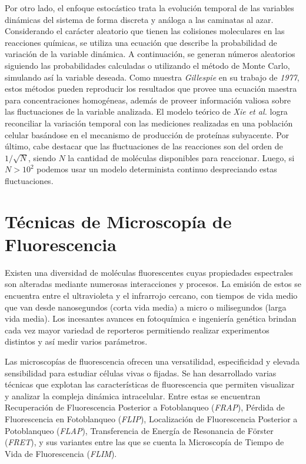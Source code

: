 Por otro lado, el enfoque estocástico trata la evolución temporal de las variables dinámicas del sistema de forma discreta y análoga a las caminatas al azar. Considerando el carácter aleatorio que tienen las colisiones moleculares en las reacciones químicas, se utiliza una ecuación que describe la probabilidad de variación de la variable dinámica. A continuación, se generan números aleatorios siguiendo las probabilidades calculadas o utilizando el método de Monte Carlo, simulando así la variable deseada\cite{Gillespie1977}. Como muestra \textit{Gillespie} en su trabajo de \textit{1977}\cite{Gillespie1977}, estos métodos pueden reproducir los resultados que provee una ecuación maestra para concentraciones homogéneas, además de proveer información valiosa sobre las fluctuaciones de la variable analizada. El modelo teórico de \textit{Xie et al.} logra reconciliar la variación temporal con las mediciones realizadas en una población celular basándose en el mecanismo de producción de proteínas subyacente\cite{Friedman2006}. Por último, cabe destacar que las fluctuaciones de las reacciones son del orden de $1/\sqrt{N}$, siendo $N$ la cantidad de moléculas disponibles para reaccionar. Luego, si $N>10^2$ podemos usar un modelo determinista continuo despreciando estas fluctuaciones\cite{Chen2010}.

\section{Técnicas de Microscopía de Fluorescencia}

Existen una diversidad de moléculas fluorescentes cuyas propiedades espectrales son alteradas mediante numerosas interacciones y procesos. La emisión de estos se encuentra entre el ultravioleta y el infrarrojo cercano, con tiempos de vida medio que van desde nanosegundos (corta vida media) a micro o milisegundos (larga vida media). Los incesantes avances en fotoquímica e ingeniería genética brindan cada vez mayor variedad de reporteros permitiendo realizar experimentos distintos y así medir varios parámetros\cite{Lakowicz2006}.

Las microscopías de fluorescencia ofrecen una versatilidad, especificidad y elevada sensibilidad para estudiar células vivas o fijadas. Se han desarrollado varias técnicas que explotan las características de fluorescencia que permiten visualizar y analizar la compleja dinámica intracelular. Entre estas se encuentran Recuperación de Fluorescencia Posterior a Fotoblanqueo (\textit{FRAP}), Pérdida de Fluorescencia en Fotoblanqueo (\textit{FLIP}), Localización de Fluorescencia Posterior a Potoblanqueo (\textit{FLAP}), Transferencia de Energía de Resonancia de Förster (\textit{FRET}), y sus variantes entre las que se cuenta la Microscopía de Tiempo de Vida de Fluorescencia (\textit{FLIM})\cite{Ishikawa-Ankerhold2012}.

